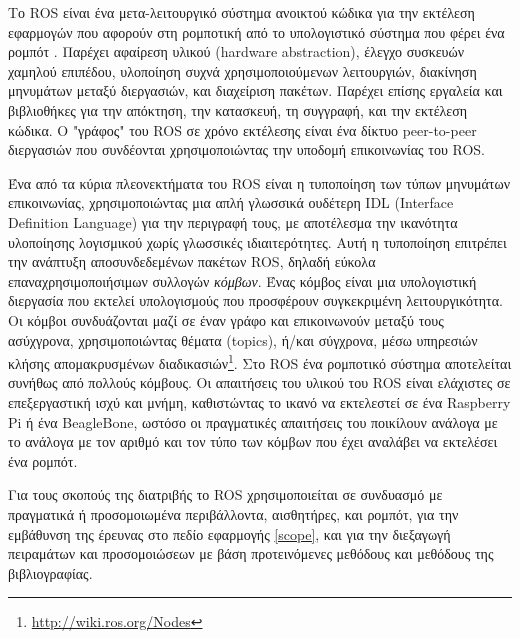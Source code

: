 Το ROS είναι ένα μετα-λειτουργικό σύστημα ανοικτού κώδικα για την εκτέλεση
εφαρμογών που αφορούν στη ρομποτική από το υπολογιστικό σύστημα που φέρει ένα
ρομπότ \cite{Ng2009}. Παρέχει αφαίρεση υλικού (hardware abstraction), έλεγχο
συσκευών χαμηλού επιπέδου, υλοποίηση συχνά χρησιμοποιούμενων λειτουργιών,
διακίνηση μηνυμάτων μεταξύ διεργασιών, και διαχείριση πακέτων. Παρέχει επίσης
εργαλεία και βιβλιοθήκες για την απόκτηση, την κατασκευή, τη συγγραφή, και την
εκτέλεση κώδικα. Ο "γράφος" του ROS σε χρόνο εκτέλεσης είναι ένα δίκτυο
peer-to-peer διεργασιών που συνδέονται χρησιμοποιώντας την υποδομή επικοινωνίας
του ROS.

Ένα από τα κύρια πλεονεκτήματα του ROS είναι η τυποποίηση των τύπων μηνυμάτων
επικοινωνίας, χρησιμοποιώντας μια απλή γλωσσικά ουδέτερη IDL (Interface
Definition Language) για την περιγραφή τους, με αποτέλεσμα την ικανότητα
υλοποίησης λογισμικού χωρίς γλωσσικές ιδιαιτερότητες. Αυτή η τυποποίηση
επιτρέπει την ανάπτυξη αποσυνδεδεμένων πακέτων ROS, δηλαδή εύκολα
επαναχρησιμοποιήσιμων συλλογών \textit{κόμβων}. Ένας κόμβος είναι μια
υπολογιστική διεργασία που εκτελεί υπολογισμούς που προσφέρουν συγκεκριμένη
λειτουργικότητα. Οι κόμβοι συνδυάζονται μαζί σε έναν γράφο και επικοινωνούν
μεταξύ τους ασύχγρονα, χρησιμοποιώντας θέματα (topics), ή/και σύγχρονα, μέσω
υπηρεσιών κλήσης απομακρυσμένων
διαδικασιών\footnote{\url{http://wiki.ros.org/Nodes}}. Στο ROS ένα ρομποτικό
σύστημα αποτελείται συνήθως από πολλούς κόμβους.  Οι απαιτήσεις του υλικού του
ROS είναι ελάχιστες σε επεξεργαστική ισχύ και μνήμη, καθιστώντας το ικανό να
εκτελεστεί σε ένα Raspberry Pi ή ένα BeagleBone, ωστόσο οι πραγματικές
απαιτήσεις του ποικίλουν ανάλογα με το ανάλογα με τον αριθμό και τον τύπο των
κόμβων που έχει αναλάβει να εκτελέσει ένα ρομπότ.

Για τους σκοπούς της διατριβής το ROS χρησιμοποιείται σε συνδυασμό με πραγματικά
ή προσομοιωμένα περιβάλλοντα, αισθητήρες, και ρομπότ, για την εμβάθυνση
της έρευνας στο πεδίο εφαρμογής \ref{scope}, και για την διεξαγωγή πειραμάτων
και προσομοιώσεων με βάση προτεινόμενες μεθόδους και μεθόδους της βιβλιογραφίας.
